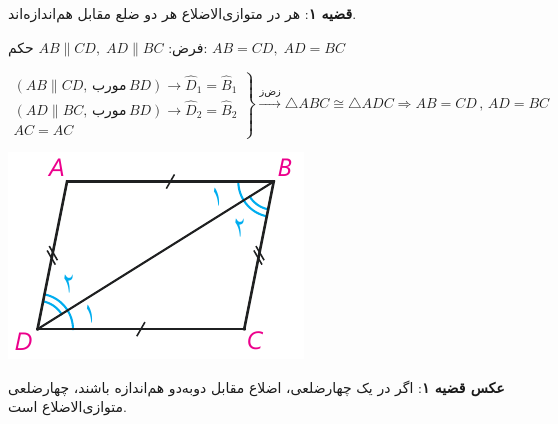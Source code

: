 \documentclass[12pt, a4paper]{book}
\begin{document}
\textbf{قضیه ۱}: هر در متوازی‌الاضلاع هر دو ضلع مقابل هم‌اندازه‌اند.

\begin{minipage}{.7\textwidth}
		\centering فرض: 
		$AB \parallel CD, \; AD \parallel BC$
		\qquad حکم:
		$AB = CD, \; AD = BC$
	\begin{flushleft}
			$ \left. \begin{array}{rll}
		(AB \parallel CD, \, \text{مورب} \, BD ) \rightarrow \widehat{D}_1 = \widehat{B}_1 \\ (AD \parallel BC, \, \text{مورب} \, BD ) \rightarrow \widehat{D}_2 = \widehat{B}_2 \\ AC =AC
		\end{array} \right\} \xrightarrow{\text{زض‌ز}} \triangle ABC \cong  \triangle ADC 
		\Rightarrow AB = CD \, , \, AD = BC$
	\end{flushleft}
\end{minipage}
\begin{minipage}{.28\textwidth}
	\begin{flushleft}
		\includegraphics{"Shapes/Fasl - 3/Dars 1/qazie 1.pdf"}
	\end{flushleft}
\end{minipage}
\newline \bigskip \bigskip

\textbf{عکس قضیه ۱}: اگر در یک چهارضلعی، اضلاع مقابل دوبه‌دو هم‌اندازه باشند، چهارضلعی متوازی‌الاضلاع است.
\end{document}
